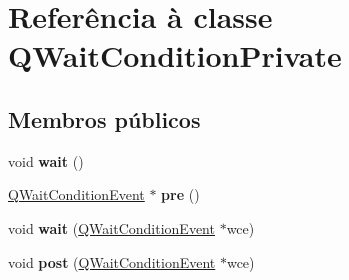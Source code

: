\hypertarget{class_q_wait_condition_private}{\section{Referência à classe Q\-Wait\-Condition\-Private}
\label{class_q_wait_condition_private}
}
\subsection*{Membros públicos}
\begin{DoxyCompactItemize}
\item 
\hypertarget{class_q_wait_condition_private_aa3b21853f890838c88d047d6c2786917}{void {\bfseries wait} ()}\label{class_q_wait_condition_private_aa3b21853f890838c88d047d6c2786917}

\item 
\hypertarget{class_q_wait_condition_private_a59c3db1e66737920bc2682a1af5bebba}{\hyperlink{class_q_wait_condition_event}{Q\-Wait\-Condition\-Event} $\ast$ {\bfseries pre} ()}\label{class_q_wait_condition_private_a59c3db1e66737920bc2682a1af5bebba}

\item 
\hypertarget{class_q_wait_condition_private_ade86e9caa5a802949571926fe79ac2b4}{void {\bfseries wait} (\hyperlink{class_q_wait_condition_event}{Q\-Wait\-Condition\-Event} $\ast$wce)}\label{class_q_wait_condition_private_ade86e9caa5a802949571926fe79ac2b4}

\item 
\hypertarget{class_q_wait_condition_private_ac675c0665e2cad9cd838fade92028c0e}{void {\bfseries post} (\hyperlink{class_q_wait_condition_event}{Q\-Wait\-Condition\-Event} $\ast$wce)}\label{class_q_wait_condition_private_ac675c0665e2cad9cd838fade92028c0e}

\end{DoxyCompactItemize}
